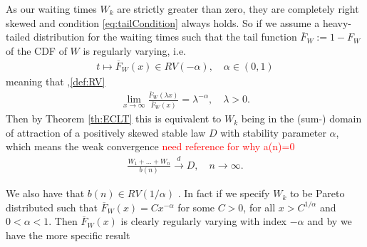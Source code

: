 \documentclass[honours,12pt]{UNSWthesis}
\newcommand{\1}{\mathbf 1}
\numberwithin{equation}{section}
\theoremstyle{definition}
\theoremstyle{remark}
\begin{document}
As our waiting times $W_k$ are strictly greater than zero, they are completely right skewed and condition \ref{eq:tailCondition} always holds. So if we assume a heavy-tailed distribution for the waiting times such that the tail function 
$\overline F_W := 1 - F_W$ of the CDF of $W$ is regularly varying, i.e.
\begin{align}
t \mapsto \overline F_W(x) \in RV(-\alpha), \quad \alpha \in (0,1)
\end{align}
meaning that \cite{seneta,thebook},\ref{def:RV}
\begin{align*}
\lim_{x \to \infty}\frac{\overline F_W(\lambda x)}{\overline F_W(x)}
= \lambda^{-\alpha}, \quad \lambda > 0.
\end{align*}
Then by Theorem \ref{th:ECLT}
this is equivalent to $W_k$ being in the 
(sum-) domain of attraction of a positively skewed stable law $D$ with 
stability parameter $\alpha$, which means the weak convergence \textcolor{red}{need reference for why a(n)=0}
\begin{align}
\frac{W_1 + \ldots + W_n}{b(n)} \overset{d}{\longrightarrow} D, \quad n \to \infty.
\end{align}

\noindent We also have that $b(n)\in RV(1/\alpha)$ \cite[Prop~4.15]{MeerschaertSikorskii2012}. In fact if we specify $W_k$ to be Pareto distributed such that $\overline F_W(x)=Cx^{-\alpha}$ for some $C>0$, for all $x>C^{1/\alpha}$ and $0<\alpha<1$. Then $\overline F_W(x)$ is clearly regularly varying with index $-\alpha$ and by \cite[Th~3.37]{MeerschaertSikorskii2012} we have the more specific result
\end{document}
